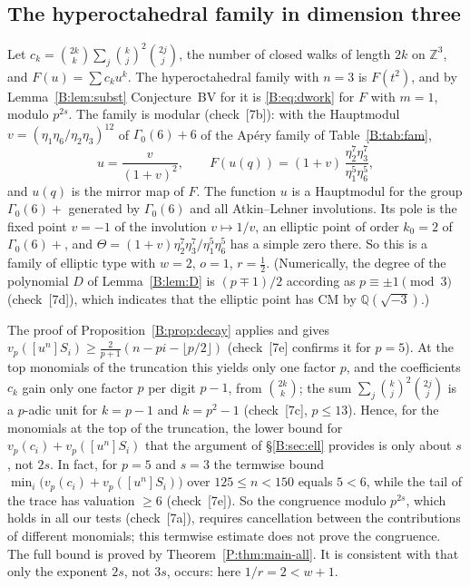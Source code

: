 \documentclass[11pt,a4paper]{article}
\theoremstyle{definition}\newtheorem{definition}[theorem]{Definition}
\theoremstyle{remark}\newtheorem{remark}[theorem]{Remark}
\newcommand{\Z}{\mathbb Z}
\newcommand{\Q}{\mathbb Q}
\numberwithin{equation}{section}
\begin{document}
\subsection{The hyperoctahedral family in dimension three}\label{B:ss:hyp3}
Let $c_k=\binom{2k}k\sum_j\binom kj^2\binom{2j}j$, the number of closed walks of length $2k$ on $\Z^3$, and
$F(u)=\sum c_ku^k$. The hyperoctahedral family with $n=3$ is $F(t^2)$, and by Lemma~\ref{B:lem:subst} Conjecture~BV for it
is \eqref{B:eq:dwork} for $F$ with $m=1$, modulo $p^{2s}$. The family is modular (check~[7b]): with the Hauptmodul
$v=(\eta_1\eta_6/\eta_2\eta_3)^{12}$ of $\Gamma_0(6)+6$ of the Ap\'ery family of Table~\ref{B:tab:fam},
\[
u=\frac v{(1+v)^2},\qquad F(u(q))=(1+v)\,\frac{\eta_2^7\eta_3^7}{\eta_1^5\eta_6^5},
\]
and $u(q)$ is the mirror map of $F$. The function $u$ is a Hauptmodul for the group $\Gamma_0(6)+$ generated by
$\Gamma_0(6)$ and all Atkin--Lehner involutions. Its pole is the fixed point $v=-1$ of the involution $v\mapsto1/v$, an
elliptic point of order $k_0=2$ of $\Gamma_0(6)+$, and $\Theta=(1+v)\eta_2^7\eta_3^7/\eta_1^5\eta_6^5$ has a simple zero there.
So this is a family of elliptic type with $w=2$, $o=1$, $r=\frac12$. (Numerically, the degree of the polynomial $D$ of
Lemma~\ref{B:lem:D} is $(p\mp1)/2$ according as $p\equiv\pm1\pmod3$ (check~[7d]), which indicates that the elliptic point has CM by
$\Q(\sqrt{-3})$.)

The proof of Proposition~\ref{B:prop:decay} applies and gives
$v_p([u^n]S_i)\ge\frac2{p+1}(n-pi-\lfloor p/2\rfloor)$ (check~[7e] confirms it for $p=5$). At the top monomials of the
truncation this yields only one factor $p$, and the coefficients $c_k$ gain only one factor $p$ per digit $p-1$, from
$\binom{2k}k$; the sum $\sum_j\binom kj^2\binom{2j}j$ is a $p$-adic unit for $k=p-1$ and $k=p^2-1$ (check~[7c],
$p\le13$). Hence, for the monomials at the top of the truncation, the lower bound for $v_p(c_i)+v_p([u^n]S_i)$ that the
argument of \S\ref{B:sec:ell} provides is only about $s$, not $2s$. In fact, for $p=5$ and $s=3$ the termwise bound
$\min_i\bigl(v_p(c_i)+v_p([u^n]S_i)\bigr)$ over $125\le n<150$ equals $5<6$, while the tail of the trace has valuation
$\ge6$ (check~[7e]). So the congruence modulo $p^{2s}$, which holds in all our tests (check~[7a]), requires cancellation
between the contributions of different monomials; this termwise estimate does not prove the congruence. The full bound is proved by Theorem~\ref{P:thm:main-all}. It is consistent with
\cite[Remark~1.14]{Beu26} that only the exponent $2s$, not $3s$, occurs: here $1/r=2<w+1$.
\end{document}
